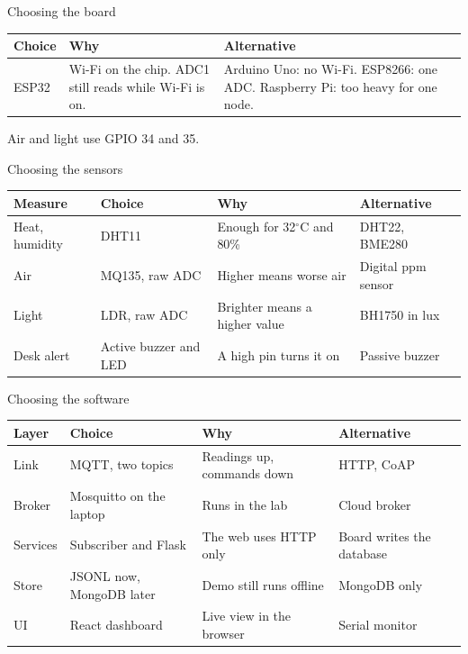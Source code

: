 \documentclass[pdf]{beamer}
\begin{document}
\begin{frame}{Choosing the board}
    \centering
    \small
    \setlength{\tabcolsep}{5pt}
    \setlength{\extrarowheight}{3pt}
    \begin{tabularx}{\textwidth}{@{} K Y Y @{}}
        \toprule
        \textbf{Choice} & \textbf{Why} & \textbf{Alternative} \\
        \midrule
        ESP32 &
        Wi-Fi on the chip. ADC1 still reads while Wi-Fi is on. &
        Arduino Uno: no Wi-Fi. ESP8266: one ADC. Raspberry Pi: too heavy for one node. \\
        \bottomrule
    \end{tabularx}

    \vspace{0.7em}
    {\scriptsize Air and light use GPIO 34 and 35.}
\end{frame}

\begin{frame}{Choosing the sensors}
    \centering
    \small
    \setlength{\tabcolsep}{5pt}
    \setlength{\extrarowheight}{2pt}
    \begin{tabularx}{\textwidth}{@{} L K Y Y @{}}
        \toprule
        \textbf{Measure} & \textbf{Choice} & \textbf{Why} & \textbf{Alternative} \\
        \midrule
        Heat, humidity & DHT11 & Enough for 32$^\circ$C and 80\% & DHT22, BME280 \\
        Air & MQ135, raw ADC & Higher means worse air & Digital ppm sensor \\
        Light & LDR, raw ADC & Brighter means a higher value & BH1750 in lux \\
        Desk alert & Active buzzer and LED & A high pin turns it on & Passive buzzer \\
        \bottomrule
    \end{tabularx}
\end{frame}

\begin{frame}{Choosing the software}
    \centering
    \small
    \setlength{\tabcolsep}{5pt}
    \setlength{\extrarowheight}{2pt}
    \begin{tabularx}{\textwidth}{@{} L K Y Y @{}}
        \toprule
        \textbf{Layer} & \textbf{Choice} & \textbf{Why} & \textbf{Alternative} \\
        \midrule
        Link & MQTT, two topics & Readings up, commands down & HTTP, CoAP \\
        Broker & Mosquitto on the laptop & Runs in the lab & Cloud broker \\
        Services & Subscriber and Flask & The web uses HTTP only & Board writes the database \\
        Store & JSONL now, MongoDB later & Demo still runs offline & MongoDB only \\
        UI & React dashboard & Live view in the browser & Serial monitor \\
        \bottomrule
    \end{tabularx}
\end{frame}
\end{document}

